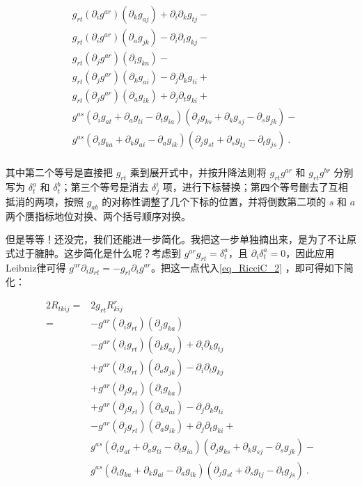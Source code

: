 \begin{equation}
\begin{aligned}
&g_{rt}(\partial_ig^{ar})(\partial_kg_{aj})+\partial_i\partial_kg_{tj}-\\
&g_{rt}(\partial_ig^{ar})(\partial_ag_{jk})-\partial_i\partial_tg_{kj}-\\%
&g_{rt}(\partial_jg^{ar})(\partial_ig_{ka})-\\
&g_{rt}(\partial_jg^{ar})(\partial_kg_{ai})-\partial_j\partial_kg_{ti}+\\
&g_{rt}(\partial_jg^{ar})(\partial_ag_{ik})+\partial_j\partial_tg_{ki}+\\%
&g^{as}(\partial_ig_{at}+\partial_ag_{ti}-\partial_tg_{ia})(\partial_jg_{ks}+\partial_kg_{sj}-\partial_sg_{jk})-\\
&g^{as}(\partial_ig_{ka}+\partial_kg_{ai}-\partial_ag_{ik})(\partial_jg_{st}+\partial_sg_{tj}-\partial_tg_{js})~.\\
\end{aligned}
\end{equation}

其中第二个等号是直接把 $g_{rt}$ 乘到展开式中，并按升降法则将 $g_{rt}g^{ar}$ 和 $g_{rt}g^{br}$ 分别写为 $\delta^a_t$ 和 $\delta^b_t$；第三个等号是消去 $\delta^i_j$ 项，进行下标替换；第四个等号删去了互相抵消的两项，按照 $g_{ab}$ 的对称性调整了几个下标的位置，并将倒数第二项的 $s$ 和 $a$ 两个赝指标地位对换、两个括号顺序对换。

但是等等！还没完，我们还能进一步简化。我把这一步单独摘出来，是为了不让原式过于臃肿。这步简化是什么呢？考虑到 $g^{ar}g_{rt}=\delta^a_t$，且 $\partial_i\delta^a_t=0$，因此应用Leibniz律可得 $g^{ar}\partial_ig_{rt}=-g_{rt}\partial_ig^{ar}$。把这一点代入\autoref{eq_RicciC_2} ，即可得如下简化：

\begin{equation}\label{eq_RicciC_3}
\begin{aligned}
2R_{tkij}={}&2g_{rt}R^r_{kij}\\
={}&-g^{ar}(\partial_ig_{rt})(\partial_jg_{ka})\\
&-g^{ar}(\partial_ig_{rt})(\partial_kg_{aj})+\partial_i\partial_kg_{tj}\\
&+g^{ar}(\partial_ig_{rt})(\partial_ag_{jk})-\partial_i\partial_tg_{kj}\\%
&+g^{ar}(\partial_jg_{rt})(\partial_ig_{ka})\\
&+g^{ar}(\partial_jg_{rt})(\partial_kg_{ai})-\partial_j\partial_kg_{ti}\\
&-g^{ar}(\partial_jg_{rt})(\partial_ag_{ik})+\partial_j\partial_tg_{ki}+\\%
&g^{as}(\partial_ig_{at}+\partial_ag_{ti}-\partial_tg_{ia})(\partial_jg_{ks}+\partial_kg_{sj}-\partial_sg_{jk})-\\
&g^{as}(\partial_ig_{ka}+\partial_kg_{ai}-\partial_ag_{ik})(\partial_jg_{st}+\partial_sg_{tj}-\partial_tg_{js})~.\\
\end{aligned}
\end{equation}



